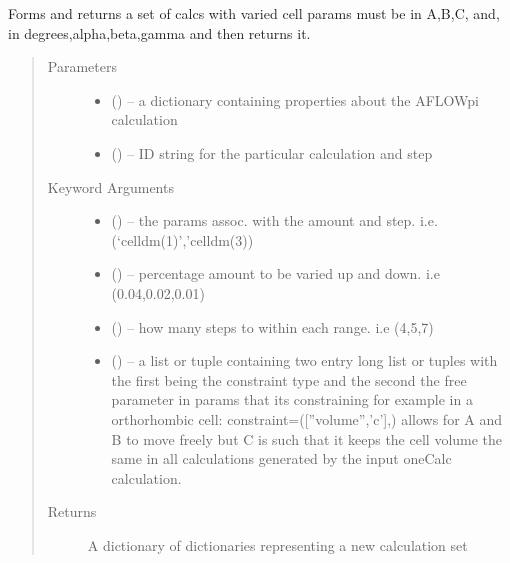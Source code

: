 \documentclass[letterpaper,10pt,english]{sphinxmanual}
\begin{document}
\begin{fulllineitems}
\label{\detokenize{prep:prep.varyCellParams}}
Forms and returns a set of calcs with varied cell params must be in A,B,C,
and, in degrees,alpha,beta,gamma and then returns it.
\begin{quote}\begin{description}
\item[{Parameters}] \leavevmode\begin{itemize}
\item {} 
 () -- a dictionary containing properties about the AFLOWpi calculation

\item {} 
 () -- ID string for the particular calculation and step

\end{itemize}

\item[{Keyword Arguments}] \leavevmode\begin{itemize}
\item {} 
 () -- the params assoc. with the amount and step. i.e. (`celldm(1)','celldm(3))

\item {} 
 () -- percentage amount to be varied up and down. i.e (0.04,0.02,0.01)

\item {} 
 () -- how many steps to within each range. i.e (4,5,7)

\item {} 
 () -- a list or tuple containing two entry long list or tuples with
the first being the constraint type and the second the free
parameter in params that its constraining for example in a
orthorhombic cell: constraint=({[}''volume'','c'{]},) allows for A and B
to move freely but C is such that it keeps the cell volume the same
in all calculations generated by the input oneCalc calculation.

\end{itemize}

\item[{Returns}] \leavevmode
A dictionary of dictionaries representing a new calculation set

\end{description}\end{quote}

\end{fulllineitems}
\end{document}

